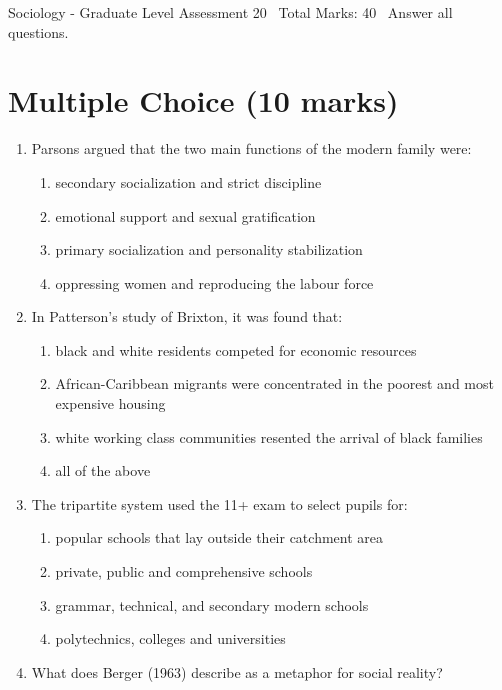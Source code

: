 \documentclass[12pt]{article}
\begin{document}
\begin{center}
Sociology - Graduate Level Assessment 20 \
Total Marks: 40 \
Answer all questions.
\end{center}

\section*{Multiple Choice (10 marks)}
\begin{enumerate}[label=\arabic*.]
\item Parsons argued that the two main functions of the modern family were:
\begin{enumerate}[label=(\alph*)]
    \item secondary socialization and strict discipline
    \item emotional support and sexual gratification
    \item primary socialization and personality stabilization
    \item oppressing women and reproducing the labour force
\end{enumerate}
\item In Patterson's study of Brixton, it was found that:
\begin{enumerate}[label=(\alph*)]
    \item black and white residents competed for economic resources
    \item African-Caribbean migrants were concentrated in the poorest and most expensive housing
    \item white working class communities resented the arrival of black families
    \item all of the above
\end{enumerate}
\item The tripartite system used the 11+ exam to select pupils for:
\begin{enumerate}[label=(\alph*)]
    \item popular schools that lay outside their catchment area
    \item private, public and comprehensive schools
    \item grammar, technical, and secondary modern schools
    \item polytechnics, colleges and universities
\end{enumerate}
\item What does Berger (1963) describe as a metaphor for social reality?
\begin{enumerate}[label=(\alph*)]

\end{enumerate}
\end{enumerate}
\end{document}
